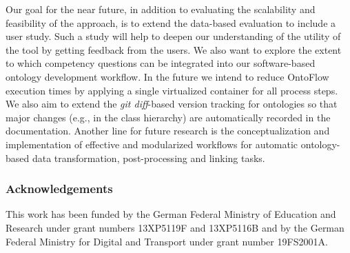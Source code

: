 \documentclass[runningheads]{llncs}
\begin{document}
Our goal for the near future, in addition to evaluating the scalability and feasibility of the approach, is to extend the data-based evaluation to include a user study. Such a study will help to deepen our understanding of the utility of the tool by getting feedback from the users. We also want to explore the extent to which competency questions can be integrated into our software-based ontology development workflow. 
In the future we intend to reduce OntoFlow execution times by applying a single virtualized container for all process steps. 
We also aim to extend the \textit{git diff}-based version tracking for ontologies so that major changes (e.g., in the class hierarchy) are automatically recorded in the documentation. Another line for future research is the conceptualization and implementation of effective and modularized workflows for automatic ontology-based data transformation, post-processing and linking tasks. 

%
%
% 
% 



%
%
\subsubsection*{Acknowledgements}

This work has been funded by the German Federal Ministry of Education and Research under grant numbers 13XP5119F and 13XP5116B and by the German Federal Ministry for Digital and Transport under grant number 19FS2001A.
\end{document}
